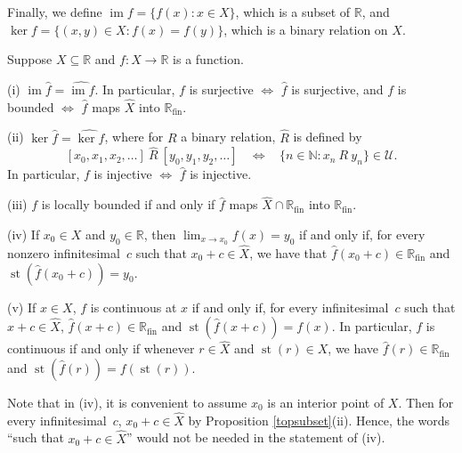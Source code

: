 \documentclass{article}
\def\U{\mathscr U}
\def\N{\mathbb N}
\def\R{\mathbb R}
\def\Rfin{\mathbb R_{\operatorname{fin}}}
\def\st{\operatorname{st}}
\def\im{\operatorname{im}}
\begin{document}
Finally, we define $\im f=\{f(x):x\in X\}$, which is a subset of $\R$, and $\ker f=\{(x,y)\in X:f(x)=f(y)\}$, which is a binary relation on $X$.
\begin{proposition}\label{topfunction}
Suppose $X\subseteq\R$ and $f:X\to\R$ is a function.

(i) $\im\widehat f=\widehat{\im f}$.  In particular, $f$ is surjective $\iff$ $\widehat f$ is surjective, and $f$ is bounded $\iff$ $\widehat f$ maps $\widehat X$ into $\Rfin$.

(ii) $\ker\widehat f=\widehat{\ker f}$, where for $R$ a binary relation, $\widehat R$ is defined by
$$[x_0,x_1,x_2,\dots]~\widehat R~[y_0,y_1,y_2,\dots]~~~~\iff~~~~\{n\in\N:x_n~R~y_n\}\in\U.$$
In particular, $f$ is injective $\iff$ $\widehat f$ is injective.

(iii) $f$ is locally bounded if and only if $\widehat f$ maps $\widehat X\cap\Rfin$ into $\Rfin$.

(iv) If $x_0\in X$ and $y_0\in\R$, then $\lim_{x\to x_0}f(x)=y_0$ if and only if, for every nonzero infinitesimal~$c$ such that $x_0+c\in\widehat X$, we have that $\widehat f(x_0+c)\in\Rfin$ and $\st(\widehat f(x_0+c))=y_0$.

(v) If $x\in X$, $f$ is continuous at $x$ if and only if, for every infinitesimal~$c$ such that $x+c\in\widehat X$, $\widehat f(x+c)\in\Rfin$ and $\st(\widehat f(x+c))=f(x)$.  In particular, $f$ is continuous if and only if whenever $r\in\widehat X$ and $\st(r)\in X$, we have $\widehat f(r)\in\Rfin$ and $\st(\widehat f(r))=f(\st(r))$.
\end{proposition}
\noindent Note that in (iv), it is convenient to assume $x_0$ is an interior point of $X$.  Then for every infinitesimal~$c$, $x_0+c\in\widehat X$ by Proposition \ref{topsubset}(ii).  Hence, the words ``such that $x_0+c\in\widehat X$'' would not be needed in the statement of (iv).
\end{document}
